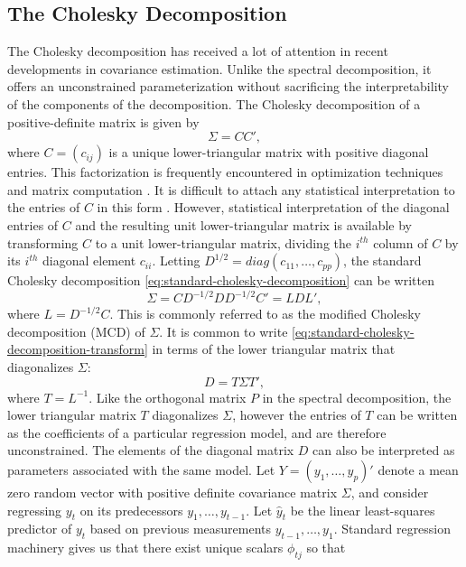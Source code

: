 \subsection{The Cholesky Decomposition} \label{chapter-1-cholesky-decomposition}

The Cholesky decomposition has received a lot of attention in recent developments in covariance estimation. Unlike the spectral decomposition, it offers an unconstrained parameterization without sacrificing the interpretability of the components of the decomposition. The Cholesky decomposition of a positive-definite matrix is given by
\begin{equation}\label{eq:standard-cholesky-decomposition}
\Sigma = CC',
\end{equation}
\noindent
where $C = \left(c_{ij} \right)$ is a unique lower-triangular matrix with positive diagonal entries. This factorization is frequently encountered in optimization techniques and matrix computation \citep{golub2012matrix}. It is difficult to attach any statistical interpretation to the entries of $C$ in this form \citep{pinheiro1996unconstrained}. However, statistical interpretation of the diagonal entries of $C$ and the resulting unit lower-triangular matrix is available by transforming $C$ to a unit lower-triangular matrix, dividing the $i^{th}$ column of $C$ by its $i^{th}$ diagonal element $c_{ii}$. Letting $D^{1/2} = diag\left( c_{11},\dots, c_{pp} \right)$, the standard Cholesky decomposition \eqref{eq:standard-cholesky-decomposition} can be written
\begin{equation}\label{eq:standard-cholesky-decomposition-transform}
\Sigma = CD^{-1/2}DD^{-1/2}C' = L D L',
\end{equation}
\noindent
where $L = D^{-1/2}C$. This is commonly referred to as the modified Cholesky decomposition (MCD) of $\Sigma$. It is common to write \eqref{eq:standard-cholesky-decomposition-transform} in terms of the lower triangular matrix that diagonalizes $\Sigma$:
\begin{equation}\label{eq:modified-cholesky-decomposition}
D = T\Sigma T',
\end{equation}
 \noindent
where $T = L^{-1}$. Like the orthogonal matrix $P$ in the spectral decomposition, the lower triangular matrix $T$ diagonalizes $\Sigma$, however the entries of $T$ can be written as the coefficients of a particular regression model, and are therefore unconstrained. The elements of the diagonal matrix $D$ can also be interpreted as parameters associated with the same model. Let $Y = \left( y_1,\dots, y_p \right)'$ denote a mean zero random vector with positive definite covariance matrix $\Sigma$, and consider regressing $y_t$ on its predecessors $y_1, \dots, y_{t-1}$. Let $\hat{y}_t$ be the linear least-squares predictor of $y_t$ based on previous measurements $y_{t-1}, \dots , y_1$. Standard regression machinery gives us that there exist unique scalars $\phi_{tj}$ so that
